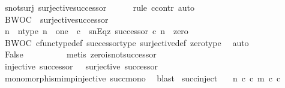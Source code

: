 \begin{isabellebody}
\ s{\isacharunderscore}{\kern0pt}not{\isacharunderscore}{\kern0pt}surj{\isacharcolon}{\kern0pt}\ {\isachardoublequoteopen}{\isasymnot}{\isacharparenleft}{\kern0pt}surjective{\isacharparenleft}{\kern0pt}successor{\isacharparenright}{\kern0pt}{\isacharparenright}{\kern0pt}{\isachardoublequoteclose}\isanewline
\ \ \ \ \isamarkupfalse%
\ {\isacharparenleft}{\kern0pt}rule\ ccontr{\isacharcomma}{\kern0pt}\ auto{\isacharparenright}{\kern0pt}\isanewline
\ \ \ \ \ \ \isamarkupfalse%
\ BWOC\ {\isacharcolon}{\kern0pt}\ {\isachardoublequoteopen}surjective{\isacharparenleft}{\kern0pt}successor{\isacharparenright}{\kern0pt}{\isachardoublequoteclose}\isanewline
\ \ \ \ \ \ \isamarkupfalse%
\ n\ \ n{\isacharunderscore}{\kern0pt}type{\isacharcolon}{\kern0pt}\ {\isachardoublequoteopen}n\ {\isacharcolon}{\kern0pt}\ one\ {\isasymrightarrow}\ {\isasymnat}\isactrlsub c{\isachardoublequoteclose}\ \ snEqz{\isacharcolon}{\kern0pt}\ {\isachardoublequoteopen}successor\ {\isasymcirc}\isactrlsub c\ n\ {\isacharequal}{\kern0pt}\ zero{\isachardoublequoteclose}\isanewline
\ \ \ \ \ \ \ \ \isamarkupfalse%
\ BWOC\ cfunc{\isacharunderscore}{\kern0pt}type{\isacharunderscore}{\kern0pt}def\ successor{\isacharunderscore}{\kern0pt}type\ surjective{\isacharunderscore}{\kern0pt}def\ zero{\isacharunderscore}{\kern0pt}type\ \isamarkupfalse%
\ auto\isanewline
\ \ \ \ \ \ \isamarkupfalse%
\ \isamarkupfalse%
\ False\isanewline
\ \ \ \ \ \ \ \ \isamarkupfalse%
\ {\isacharparenleft}{\kern0pt}metis\ zero{\isacharunderscore}{\kern0pt}is{\isacharunderscore}{\kern0pt}not{\isacharunderscore}{\kern0pt}successor{\isacharparenright}{\kern0pt}\isanewline
\ \ \ \ \isamarkupfalse%
\isanewline
\ \ \isamarkupfalse%
\ \isamarkupfalse%
\ {\isachardoublequoteopen}injective\ successor\ {\isasymand}\ {\isasymnot}\ surjective\ successor{\isachardoublequoteclose}\isanewline
\ \ \ \ \isamarkupfalse%
\ monomorphism{\isacharunderscore}{\kern0pt}imp{\isacharunderscore}{\kern0pt}injective\ succ{\isacharunderscore}{\kern0pt}mono\ \isamarkupfalse%
\ blast\isanewline
{}\isamarkupfalse%
%
\endisatagproof
{\isafoldproof}%
%
\isadelimproof
\isanewline
%
\endisadelimproof
\isanewline
{}\isamarkupfalse%
\ succ{\isacharunderscore}{\kern0pt}inject{\isacharcolon}{\kern0pt}\isanewline
\ \ \ {\isachardoublequoteopen}n\ {\isasymin}\isactrlsub c\ {\isasymnat}\isactrlsub c{\isachardoublequoteclose}\ {\isachardoublequoteopen}m\ {\isasymin}\isactrlsub c\ {\isasymnat}\isactrlsub c{\isachardoublequoteclose}\isanewline

\end{isabellebody}
